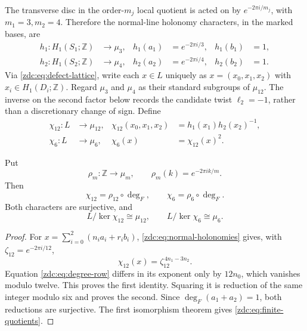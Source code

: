 The transverse disc in the order-$m_j$ local quotient is acted on by
\(e^{-2\pi i/m_j}\), with $m_1=3,m_2=4$.  Therefore the normal-line
holonomy characters, in the marked bases, are
\begin{equation}
 \begin{aligned}
 h_1:H_1(S_1;\mathbb Z)&\longrightarrow\mu_3,&
 h_1(a_1)&=e^{-2\pi i/3},& h_1(b_1)&=1,\\
 h_2:H_1(S_2;\mathbb Z)&\longrightarrow\mu_4,&
 h_2(a_2)&=e^{-2\pi i/4},& h_2(b_2)&=1.
 \end{aligned}
 \label{zdc:eq:normal-holonomies}
\end{equation}
Via \eqref{zdc:eq:defect-lattice}, write each $x\in L$ uniquely as
$x=(x_0,x_1,x_2)$ with $x_i\in H_1(D_i;\mathbb Z)$.  Regard
$\mu_3$ and $\mu_4$ as their standard subgroups of $\mu_{12}$.  The inverse
on the second factor below records the candidate twist $\ell_2=-1$, rather
than a discretionary change of sign.  Define
\begin{equation}
 \begin{aligned}
 \chi_{12}:L&\longrightarrow\mu_{12},&
 \chi_{12}(x_0,x_1,x_2)&=h_1(x_1)h_2(x_2)^{-1},\\
 \chi_6:L&\longrightarrow\mu_6,&
 \chi_6(x)&=\chi_{12}(x)^2.
 \end{aligned}
 \label{zdc:eq:finite-characters}
\end{equation}

\begin{proposition}
\label{zdc:prop:finite-reductions}
Put
\[
 \rho_m:\mathbb Z\longrightarrow\mu_m,
 \qquad \rho_m(k)=e^{-2\pi ik/m}.
\]
Then
\begin{equation}
 \boxed{\chi_{12}=\rho_{12}\circ\deg_F,
 \qquad \chi_6=\rho_6\circ\deg_F.}
 \label{zdc:eq:holonomy-degree}
\end{equation}
Both characters are surjective, and
\begin{equation}
 L/\ker\chi_{12}\cong\mu_{12},
 \qquad L/\ker\chi_6\cong\mu_6.
 \label{zdc:eq:finite-quotients}
\end{equation}
\end{proposition}

\begin{proof}
For
\(x=\sum_{i=0}^2(n_i a_i+r_i b_i)\),
\eqref{zdc:eq:normal-holonomies} gives, with
\(\zeta_{12}=e^{-2\pi i/12}\),
\[
 \chi_{12}(x)=\zeta_{12}^{\,4n_1-3n_2}.
\]
Equation \eqref{zdc:eq:degree-row} differs in its exponent only by
\(12n_0\), which vanishes modulo twelve.  This proves the first identity.
Squaring it is reduction of the same integer modulo six and proves the
second.  Since $\deg_F(a_1+a_2)=1$, both reductions are surjective.  The
first isomorphism theorem gives \eqref{zdc:eq:finite-quotients}.
\end{proof}

